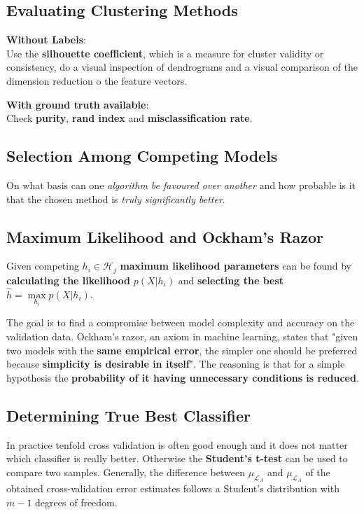 \documentclass[11pt]{article}
\theoremstyle{definition}
\begin{document}
\subsection{Evaluating Clustering Methods}
\textbf{Without Labels}:\\
Use the \textbf{silhouette coefficient}, which is a measure for cluster validity or consistency, do a visual inspection of dendrograms and a visual comparison of the dimension reduction o the feature vectors.

\vspace{1em}
\noindent
\textbf{With ground truth available}:\\
Check \textbf{purity}, \textbf{rand index} and \textbf{misclassification rate}.

\subsection{Selection Among Competing Models}
On what basis can one \emph{algorithm be favoured over another} and how probable is it that the chosen method is \emph{truly significantly better}.

\subsection{Maximum Likelihood and Ockham's Razor}
Given competing $h_i \in \mathcal{H}_j$ \textbf{maximum likelihood parameters} can be found by \textbf{calculating the likelihood} $p(X|h_i)$ and \textbf{selecting the best} $\hat{h} = \underset{h_i}{\max} p(X|h_i)$.

The goal is to find a compromise between model complexity and accuracy on the validation data. Ockham's razor, an axiom in machine learning, states that "given two models with the \textbf{same empirical error}, the simpler one should be preferred because \textbf{simplicity is desirable in itself}". The reasoning is that for a simple hypothesis the \textbf{probability of it having unnecessary conditions is reduced}.

\subsection{Determining True Best Classifier}
In practice tenfold cross validation is often good enough and it does not matter which classifier is really better. Otherwise the \textbf{Student's t-test} can be used to compare two samples. Generally, the difference between $\mu_{\mathcal{L}_A}$ and $\mu_{\mathcal{L}_A}$ of the obtained cross-validation error estimates follows a Student's distribution with $m-1$ degrees of freedom.
\end{document}
